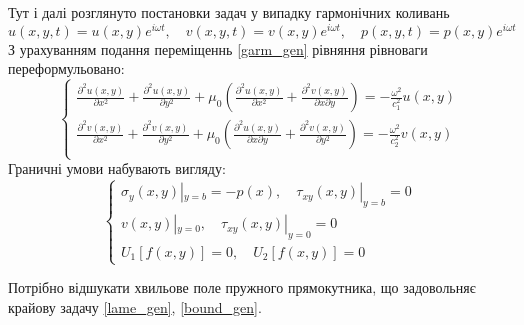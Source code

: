 Тут і далі розглянуто постановки задач у випадку гармонічних коливань
\begin{equation}\label{garm_gen}
    u(x,y,t) = u(x,y) e^{i \omega t}, \quad v(x,y,t) = v(x,y) e^{i \omega t}, \quad p(x, y, t) = p(x, y) e^{i \omega t}
\end{equation}
З урахуванням подання переміщеннь \eqref{garm_gen} рівняння рівноваги переформульовано:
\begin{equation}\label{lame_gen}
    \begin{cases}
        \frac{\partial^2 u(x,y)}{\partial x^2} + \frac{\partial^2 u(x,y)}{\partial y^2} + \mu_0 (\frac{\partial^2 u(x,y)}{\partial x^2} + \frac{\partial^2 v(x,y)}{\partial x\partial y}) = -\frac{\omega^2}{c_1^2}  u(x,y) \\
        \frac{\partial^2 v(x,y)}{\partial x^2} + \frac{\partial^2 v(x,y)}{\partial y^2} + \mu_0 (\frac{\partial^2 u(x,y)}{\partial x \partial y} + \frac{\partial^2 v(x,y)}{\partial y^2}) = -\frac{\omega^2}{c_2^2} v(x,y) \\
    \end{cases}
\end{equation}
Граничні умови набувають вигляду:
\begin{equation}\label{bound_gen}
    \begin{cases}
        \sigma_y(x, y) |_{y=b} = -p(x), \quad  \tau_{xy}(x,y) |_{y=b} =0 \\
        v(x,y) |_{y=0}, \quad \tau_{xy}(x,y) |_{y=0} =0 \\
        U_1[f(x,y)]=0, \quad U_2[f(x,y)]=0
    \end{cases}
\end{equation}


Потрібно відшукати хвильове поле пружного прямокутника,
що задовольняє крайову задачу \eqref{lame_gen}, \eqref{bound_gen}.

